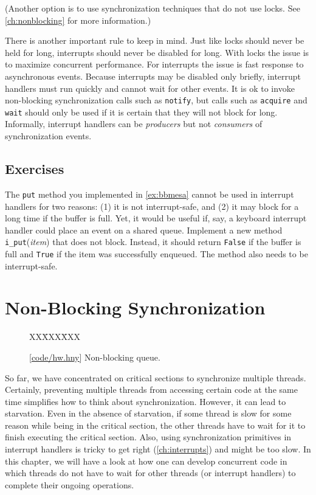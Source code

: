 \documentclass{report}
\newcommand{\harmonysource}[1]{
\begin{tabbing}
XX\=XXX\=XXX\kill
    
\end{tabbing}
}
\newcommand{\harmonylink}[1]{%
[\href{https://harmony.cs.cornell.edu/#1}{\underline{#1}}]%
}
\newenvironment{code}{
\tcolorbox
}{
\endtcolorbox
}
\begin{document}
(Another option is to use synchronization techniques that do not use locks.
See \autoref{ch:nonblocking} for more information.)

There is another important rule to keep in mind.  Just like locks should never be held
for long, interrupts should never be disabled for long.  With locks the issue is to
maximize concurrent performance.  For interrupts the issue is fast response to
asynchronous events.  Because interrupts may be disabled only briefly, interrupt
handlers must run quickly and cannot wait for other events.  It is ok to invoke
non-blocking synchronization calls such as \texttt{notify}, but calls such as
\texttt{acquire} and \texttt{wait} should only be used if it is certain that they will not
block for long.  Informally, interrupt handlers can be
\emph{producers} but not \emph{consumers} of synchronization events.

\section*{Exercises}
\begin{problems}
\item The \texttt{put} method you implemented in \autoref{ex:bbmesa} cannot be used
in interrupt handlers for two reasons: (1) it is not interrupt-safe, and (2)
it may block for a long time if the buffer is full.  Yet, it would be useful if,
say, a keyboard interrupt handler could place an event on a shared queue.
Implement a new method \texttt{i\_put}(\textit{item}) that does not
block.  Instead, it should return \texttt{False} if the buffer is full and \texttt{True}
if the item was successfully enqueued.
The method also needs to be interrupt-safe.
\end{problems}

\chapter{Non-Blocking Synchronization}
\label{ch:nonblocking}
%

%

\begin{figure}
\begin{code}
\harmonysource{hw}
\end{code}
\caption{\harmonylink{code/hw.hny} Non-blocking queue.}
\label{fig:hw}
\end{figure}

So far, we have concentrated on critical sections to synchronize multiple
threads.  Certainly, preventing multiple threads from accessing
certain code at the same time simplifies how to think about synchronization.
However, it can lead to starvation.  Even in the absence of starvation,
if some thread is slow for some reason while being in the critical section,
the other threads have to wait for it to finish executing the critical section.
Also, using synchronization primitives in interrupt handlers is tricky
to get right (\autoref{ch:interrupts}) and might be too slow.
In this chapter, we will have a look at how one can develop concurrent
code in which threads do not have to wait for other threads (or interrupt
handlers) to complete their ongoing operations.
\end{document}
